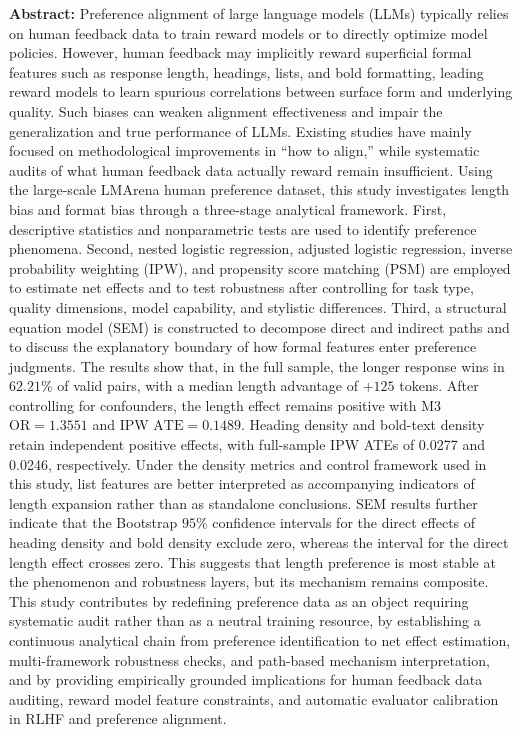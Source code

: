 \documentclass[9pt,a4paper,fontset=windows]{ctexart}
\theoremstyle{definition}
\numberwithin{equation}{section}
\begin{document}
\noindent\textbf{Abstract:}
Preference alignment of large language models (LLMs) typically relies on human feedback data to train reward models or to directly optimize model policies. However, human feedback may implicitly reward superficial formal features such as response length, headings, lists, and bold formatting, leading reward models to learn spurious correlations between surface form and underlying quality. Such biases can weaken alignment effectiveness and impair the generalization and true performance of LLMs. Existing studies have mainly focused on methodological improvements in ``how to align,'' while systematic audits of what human feedback data actually reward remain insufficient. Using the large-scale LMArena human preference dataset, this study investigates length bias and format bias through a three-stage analytical framework. First, descriptive statistics and nonparametric tests are used to identify preference phenomena. Second, nested logistic regression, adjusted logistic regression, inverse probability weighting (IPW), and propensity score matching (PSM) are employed to estimate net effects and to test robustness after controlling for task type, quality dimensions, model capability, and stylistic differences. Third, a structural equation model (SEM) is constructed to decompose direct and indirect paths and to discuss the explanatory boundary of how formal features enter preference judgments. The results show that, in the full sample, the longer response wins in \(62.21\%\) of valid pairs, with a median length advantage of \(+125\) tokens. After controlling for confounders, the length effect remains positive with M3 \(\mathrm{OR}=1.3551\) and IPW \(\mathrm{ATE}=0.1489\). Heading density and bold-text density retain independent positive effects, with full-sample IPW ATEs of 0.0277 and 0.0246, respectively. Under the density metrics and control framework used in this study, list features are better interpreted as accompanying indicators of length expansion rather than as standalone conclusions. SEM results further indicate that the Bootstrap \(95\%\) confidence intervals for the direct effects of heading density and bold density exclude zero, whereas the interval for the direct length effect crosses zero. This suggests that length preference is most stable at the phenomenon and robustness layers, but its mechanism remains composite. This study contributes by redefining preference data as an object requiring systematic audit rather than as a neutral training resource, by establishing a continuous analytical chain from preference identification to net effect estimation, multi-framework robustness checks, and path-based mechanism interpretation, and by providing empirically grounded implications for human feedback data auditing, reward model feature constraints, and automatic evaluator calibration in RLHF and preference alignment.
\end{document}
